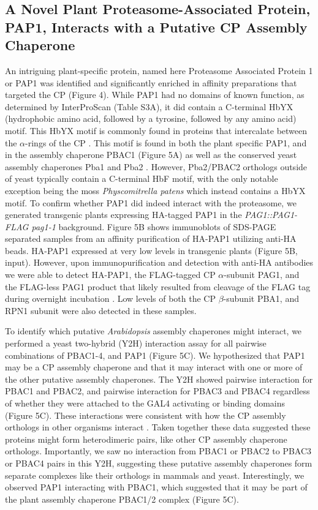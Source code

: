\subsection{A Novel Plant Proteasome-Associated Protein, PAP1, Interacts with a Putative CP Assembly Chaperone}
An intriguing plant-specific protein, named here Proteasome Associated Protein 1 or PAP1 was identified and significantly enriched in affinity preparations that targeted the CP (Figure 4). While PAP1 had no domains of known function, as determined by InterProScan (Table S3A), it did contain a C-terminal HbYX (hydrophobic amino acid, followed by a tyrosine, followed by any amino acid) motif. This HbYX motif is commonly found in proteins that intercalate between the $\alpha$-rings of the CP \citep{kusmierczyk11}. This motif is found in both the plant specific PAP1, and in the assembly chaperone PBAC1 (Figure 5A) as well as the conserved yeast assembly chaperones Pba1 and Pba2 \citep{kusmierczyk11}. However, Pba2/PBAC2 orthologs outside of yeast typically contain a C-terminal HbF motif, with the only notable exception being the moss \textit{Physcomitrella patens} which instead contains a HbYX motif.   To confirm whether PAP1 did indeed interact with the proteasome, we generated transgenic plants expressing HA-tagged PAP1 in the \textit{PAG1::PAG1-FLAG pag1-1} background. Figure 5B shows immunoblots of SDS-PAGE separated samples from an affinity purification of HA-PAP1 utilizing anti-HA beads. HA-PAP1 expressed at very low levels in transgenic plants (Figure 5B, input). However, upon immunopurification and detection with anti-HA antibodies we were able to detect HA-PAP1, the FLAG-tagged CP $\alpha$-subunit PAG1, and the FLAG-less PAG1 product that likely resulted from cleavage of the FLAG tag during overnight incubation \citep{book10}. Low levels of both the CP $\beta$-subunit PBA1, and RPN1 subunit were also detected in these samples. 

To identify which putative \textit{Arabidopsis} assembly chaperones might interact, we performed a yeast two-hybrid (Y2H) interaction assay for all pairwise combinations of PBAC1-4, and PAP1 (Figure 5C). We hypothesized that PAP1 may be a CP assembly chaperone and that it may interact with one or more of the other putative assembly chaperones. The Y2H showed pairwise interaction for PBAC1 and PBAC2, and pairwise interaction for PBAC3 and PBAC4 regardless of whether they were attached to the GAL4 activating or binding domains (Figure 5C). These interactions were consistent with how the CP assembly orthologs in other organisms interact \citep{murata09}.  Taken together these data suggested these proteins might form heterodimeric pairs, like other CP assembly chaperone orthologs. Importantly, we saw no interaction from PBAC1 or PBAC2 to PBAC3 or PBAC4 pairs in this Y2H, suggesting these putative assembly chaperones form separate complexes like their orthologs in mammals and yeast. Interestingly, we observed PAP1 interacting with PBAC1, which suggested that it may be part of the plant assembly chaperone PBAC1/2 complex (Figure 5C). 

